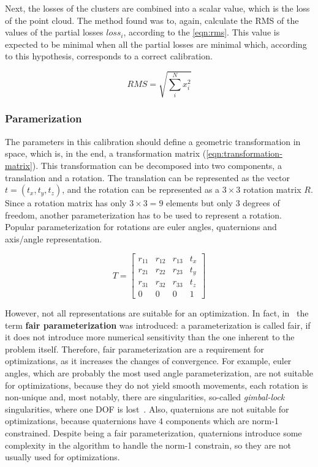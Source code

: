 Next, the losses of the clusters are combined into a scalar value, which is the loss of the point cloud. The method found was to, again, calculate the RMS of the values of the partial losses $loss_i$, according to the \cref{eqn:rms}. This value is expected to be minimal when all the partial losses are minimal which, according to this hypothesis, corresponds to a correct calibration.

\begin{equation}
    \label{eqn:rms}
    RMS = \sqrt{\sum_{i}^{N}{x_i^2}}
\end{equation}

\subsubsection{Paramerization}

The parameters in this calibration should define a geometric transformation in space, which is, in the end, a transformation matrix (\cref{eqn:transformation-matrix}). This transformation can be decomposed into two components, a translation and a rotation. The translation can be represented as the vector $t = (t_x, t_y, t_z)$, and the rotation can be represented as a $3 \times 3$ rotation matrix $R$. Since a rotation matrix has only $3 \times 3 = 9$ elements but only 3 degrees of freedom, another parameterization has to be used to represent a rotation. Popular parameterization for rotations are euler angles, quaternions and axis/angle representation. 

\begin{equation}
    \label{eqn:transformation-matrix}
    T = \left[
        \begin{array}{cccc}
            r_{11} & r_{12} & r_{13} & t_x \\
            r_{21} & r_{22} & r_{23} & t_y \\
            r_{31} & r_{32} & r_{33} & t_z \\
            0      & 0      & 0      & 1   
        \end{array}
    \right]
\end{equation}

However, not all representations are suitable for an optimization. In fact, in~\cite{hornegger99} the term \textbf{fair parameterization} was introduced: a parameterization is called fair, if it does not introduce more numerical sensitivity than the one inherent to the problem itself. Therefore, fair parameterization are a requirement for optimizations, as it increases the changes of convergence. For example, euler angles, which are probably the most used angle parameterization, are not suitable for optimizations, because they do not yield smooth movements, each rotation is non-unique and, most notably, there are singularities, so-called \textit{gimbal-lock} singularities, where one DOF is lost~\cite{schmidt01}. Also, quaternions are not suitable for optimizations, because quaternions have $4$ components which are norm-1 constrained. Despite being a fair parameterization, quaternions introduce some complexity in the algorithm to handle the norm-1 constrain, so they are not usually used for optimizations.

